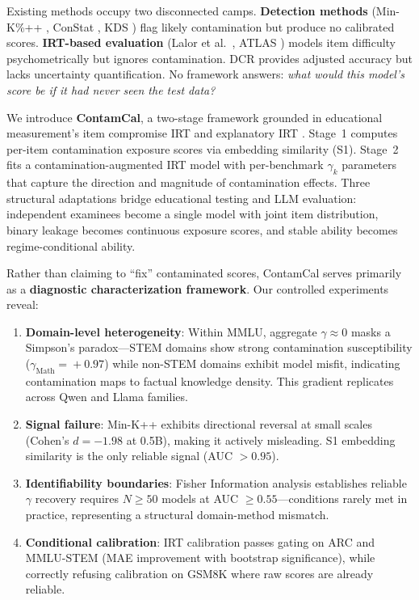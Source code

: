 \documentclass[11pt,a4paper]{article}
\begin{document}
Existing methods occupy two disconnected camps. \textbf{Detection methods} (Min-K\%++ \cite{shi2024detecting}, ConStat \cite{dekoninck2024constat}, KDS \cite{zhang2024kds}) flag likely contamination but produce no calibrated scores. \textbf{IRT-based evaluation} (Lalor et al.\ \cite{lalor2024benchmarking}, ATLAS \cite{polo2024tinybenchmarks}) models item difficulty psychometrically but ignores contamination. DCR \cite{oren2024proving} provides adjusted accuracy but lacks uncertainty quantification. No framework answers: \emph{what would this model's score be if it had never seen the test data?}

We introduce \textbf{ContamCal}, a two-stage framework grounded in educational measurement's item compromise IRT \cite{eckerly2017detecting,sinharay2017assessing} and explanatory IRT \cite{deboeck2004explanatory}. Stage~1 computes per-item contamination exposure scores via embedding similarity (S1). Stage~2 fits a contamination-augmented IRT model with per-benchmark $\gamma_k$ parameters that capture the direction and magnitude of contamination effects. Three structural adaptations bridge educational testing and LLM evaluation: independent examinees become a single model with joint item distribution, binary leakage becomes continuous exposure scores, and stable ability becomes regime-conditional ability.

Rather than claiming to ``fix'' contaminated scores, ContamCal serves primarily as a \textbf{diagnostic characterization framework}. Our controlled experiments reveal:

\begin{enumerate}[nosep,leftmargin=*]
\item \textbf{Domain-level heterogeneity}: Within MMLU, aggregate $\gamma\!\approx\!0$ masks a Simpson's paradox---STEM domains show strong contamination susceptibility ($\gamma_{\text{Math}}\!=\!+0.97$) while non-STEM domains exhibit model misfit, indicating contamination maps to factual knowledge density. This gradient replicates across Qwen and Llama families.
\item \textbf{Signal failure}: Min-K++ exhibits directional reversal at small scales (Cohen's $d = -1.98$ at 0.5B), making it actively misleading. S1 embedding similarity is the only reliable signal (AUC $> 0.95$).
\item \textbf{Identifiability boundaries}: Fisher Information analysis establishes reliable $\gamma$ recovery requires $N\!\geq\!50$ models at AUC $\geq 0.55$---conditions rarely met in practice, representing a structural domain-method mismatch.
\item \textbf{Conditional calibration}: IRT calibration passes gating on ARC and MMLU-STEM (MAE improvement with bootstrap significance), while correctly refusing calibration on GSM8K where raw scores are already reliable.
\end{enumerate}
\end{document}
